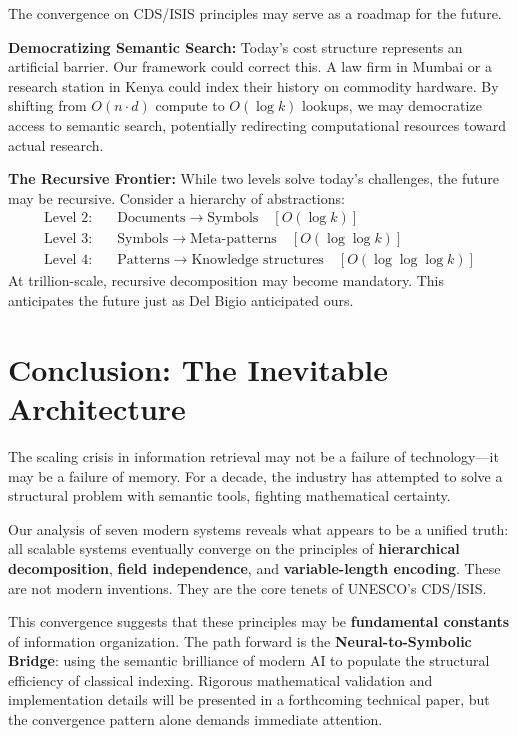 \documentclass[manuscript,screen,nonacm]{acmart}
\begin{document}
The convergence on CDS/ISIS principles may serve as a roadmap for the future.

\textbf{Democratizing Semantic Search:}
Today's cost structure represents an artificial barrier. Our framework could correct this. A law firm in Mumbai or a research station in Kenya could index their history on commodity hardware. By shifting from $O(n \cdot d)$ compute to $O(\log k)$ lookups, we may democratize access to semantic search, potentially redirecting computational resources toward actual research.

\textbf{The Recursive Frontier:}
While two levels solve today's challenges, the future may be recursive. Consider a hierarchy of abstractions:
\begin{align}
\text{Level 2:} \quad & \text{Documents} \to \text{Symbols} \quad [O(\log k)] \\
\text{Level 3:} \quad & \text{Symbols} \to \text{Meta-patterns} \quad [O(\log \log k)] \\
\text{Level 4:} \quad & \text{Patterns} \to \text{Knowledge structures} \quad [O(\log \log \log k)]
\end{align}
At trillion-scale, recursive decomposition may become mandatory. This anticipates the future just as Del Bigio anticipated ours.

\section{Conclusion: The Inevitable Architecture}

The scaling crisis in information retrieval may not be a failure of technology---it may be a failure of memory. For a decade, the industry has attempted to solve a structural problem with semantic tools, fighting mathematical certainty.

Our analysis of seven modern systems reveals what appears to be a unified truth: all scalable systems eventually converge on the principles of \textbf{hierarchical decomposition}, \textbf{field independence}, and \textbf{variable-length encoding}. These are not modern inventions. They are the core tenets of UNESCO's CDS/ISIS.

This convergence suggests that these principles may be \textbf{fundamental constants} of information organization. The path forward is the \textbf{Neural-to-Symbolic Bridge}: using the semantic brilliance of modern AI to populate the structural efficiency of classical indexing. Rigorous mathematical validation and implementation details will be presented in a forthcoming technical paper, but the convergence pattern alone demands immediate attention.
\end{document}
